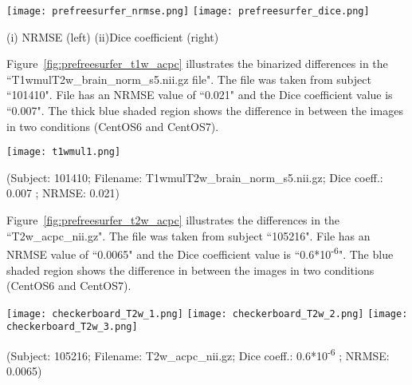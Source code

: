 \hfill \break
\begin{center}
\texttt{[image: prefreesurfer\_nrmse.png]}%
\texttt{[image: prefreesurfer\_dice.png]}
\caption*{(i) NRMSE (left) (ii)Dice coefficient (right)}
\label{fig:prefreesurfer_metric_values}
\end{center}
\hfill \break

Figure~\ref{fig:prefreesurfer_t1w_acpc} illustrates the binarized differences in the ``T1wmulT2w\_brain\_norm\_s5.nii.gz file". The file was taken from subject ``101410". File has an NRMSE value of ``0.021" and the Dice coefficient value is ``0.007". The thick blue shaded region shows the difference in between the images in two conditions (CentOS6 and CentOS7).

\hfill \break
\begin{center}
\texttt{[image: t1wmul1.png]}
\caption*{(Subject: 101410; Filename: T1wmulT2w\_brain\_norm\_s5.nii.gz; Dice coeff.: 0.007 ; NRMSE: 0.021)}
\label{fig:prefreesurfer_t1w_acpc}
\end{center}
\hfill \break

Figure~\ref{fig:prefreesurfer_t2w_acpc} illustrates the differences in the ``T2w\_acpc\_nii.gz". The file was taken from subject ``105216". File has an NRMSE value of ``0.0065" and the Dice coefficient value is ``0.6*10\textsuperscript{-6}". The blue shaded region shows the difference in between the images in two conditions (CentOS6 and CentOS7).

\hfill \break
\begin{center}
\texttt{[image: checkerboard\_T2w\_1.png]}%
\texttt{[image: checkerboard\_T2w\_2.png]}%
\texttt{[image: checkerboard\_T2w\_3.png]}
\caption*{(Subject: 105216; Filename: T2w\_acpc\_nii.gz; Dice coeff.: 0.6*10\textsuperscript{-6} ; NRMSE: 0.0065)}
\label{fig:prefreesurfer_t2w_acpc}
\end{center}
\hfill \break

